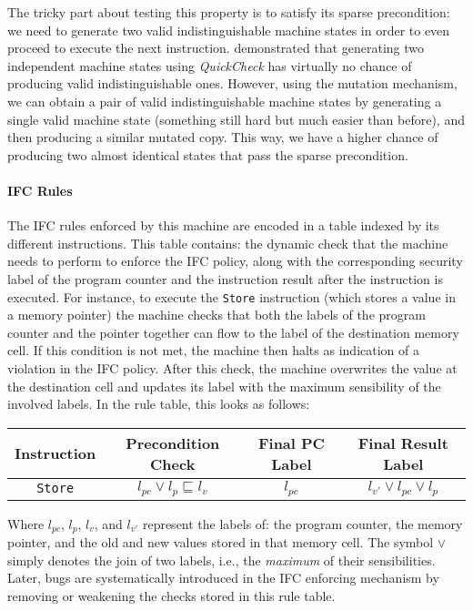 \documentclass[sigconf, anonymous, review]{acmart}
\newcommand{\quickcheck}{\textit{QuickCheck}\xspace}
\begin{document}
The tricky part about testing this property is to satisfy its sparse
precondition: we need to generate two valid indistinguishable machine states in
order to even proceed to execute the next instruction.
%
\citeauthor{lampropoulos2019coverage} demonstrated that generating two
independent machine states using \quickcheck has virtually no chance of
producing valid indistinguishable ones.
%
However, using the mutation mechanism, we can obtain a pair of valid
indistinguishable machine states by generating a single valid machine state
(something still hard but much easier than before), and then producing a similar
mutated copy.
%
This way, we have a higher chance of producing two almost identical states that
pass the sparse precondition.

\paragraph{IFC Rules}

The IFC rules enforced by this machine are encoded in a table indexed by its
different instructions.
%
This table contains: the dynamic check that the machine needs to perform to
enforce the IFC policy, along with the corresponding security label of the
program counter and the instruction result after the instruction is executed.
%
For instance, to execute the \texttt{Store} instruction (which stores a value in
a memory pointer) the machine checks that both the labels of the program counter
and the pointer together can flow to the label of the destination memory cell.
%
If this condition is not met, the machine then halts as indication of a
violation in the IFC policy.
%
After this check, the machine overwrites the value at the destination cell and
updates its label with the maximum sensibility of the involved labels.
%
In the rule table, this looks as follows:

\begin{center}
\scriptsize
\begin{tabular}{|c|c|c|c|}
\hline
\textbf{Instruction}
& \textbf{Precondition Check}
& \textbf{Final PC Label}
& \textbf{Final Result Label} \\
\hline
\texttt{Store}
& $l_{pc} \vee l_{p} \sqsubseteq l_{v}$
& $l_{pc}$
& $l_{v'} \vee l_{pc} \vee l_{p}$ \\
\hline
\end{tabular}
\end{center}

\noindent Where $l_{pc}$, $l_{p}$, $l_{v}$, and $l_{v'}$ represent the labels
of: the program counter, the memory pointer, and the old and new values stored in
that memory cell.
%
The symbol $\vee$ simply denotes the join of two labels, i.e., the
\emph{maximum} of their sensibilities.
%
Later, bugs are systematically introduced in the IFC enforcing mechanism by
removing or weakening the checks stored in this rule table.
\end{document}
